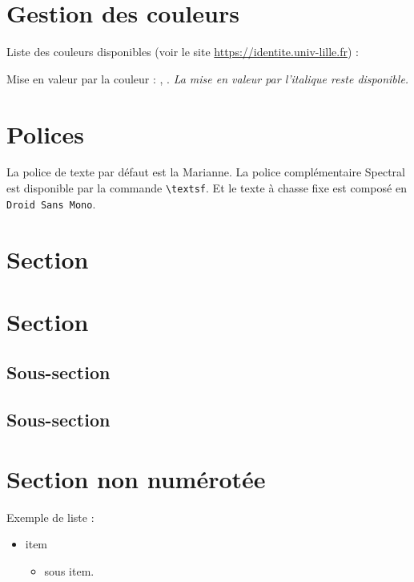 \documentclass[fontsize=10pt,oneside]{scrreprt}
\begin{document}
\section{Gestion des couleurs}

Liste des couleurs disponibles (voir le site \url{https://identite.univ-lille.fr}) :

\ListeCouleurs

Mise en valeur par la couleur : , .
\emph{La mise en valeur par l'italique reste disponible.}

\section{Polices}
La police de texte par défaut est la Marianne. La police complémentaire \textsf{Spectral} est disponible par la commande \verb|\textsf|. Et le texte à chasse fixe est composé en \texttt{Droid Sans Mono}.

\section{Section}
\lipsum[1-2]


\section{Section}
\subsection{Sous-section}
\lipsum[3]
\subsection{Sous-section}
\lipsum[4]

\section*{Section non numérotée}
Exemple de liste :
\begin{itemize}
  \item item
  \begin{itemize}
    \item sous item.
  \end{itemize}
\end{itemize}
\end{document}
